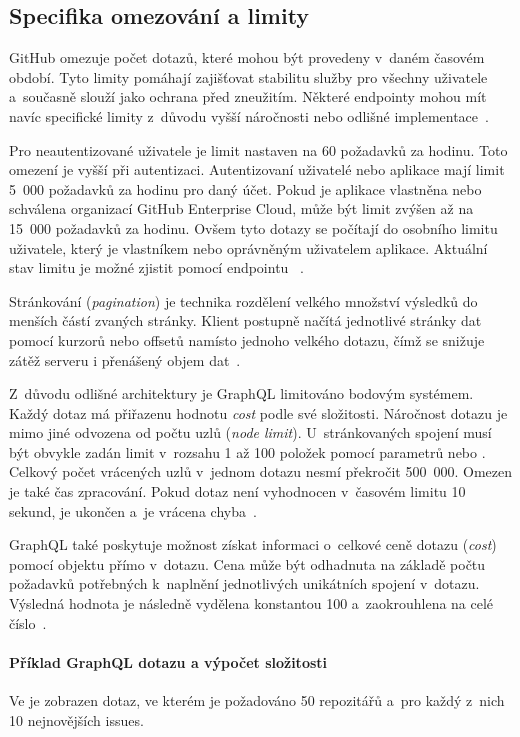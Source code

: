 \subsection{Specifika omezování a limity}
\label{subsec:github_api_limits}
GitHub omezuje počet dotazů, které mohou být provedeny v~daném časovém období. Tyto limity pomáhají zajišťovat stabilitu služby pro všechny uživatele a~současně slouží jako ochrana před zneužitím. Některé endpointy mohou mít navíc specifické limity z~důvodu vyšší náročnosti nebo odlišné implementace~\cite{github_rate_limits}.

Pro neautentizované uživatele je limit \REST \API nastaven na 60 požadavků za hodinu. Toto omezení je vyšší při autentizaci. Autentizovaní uživatelé nebo aplikace mají limit 5~000 požadavků za hodinu pro daný účet. Pokud je aplikace vlastněna nebo schválena organizací GitHub Enterprise Cloud, může být limit zvýšen až na 15~000 požadavků za hodinu. Ovšem tyto dotazy se počítají do osobního limitu uživatele, který je vlastníkem nebo oprávněným uživatelem aplikace. Aktuální stav limitu je možné zjistit pomocí endpointu ~\cite{github_rate_limits}.

Stránkování (\textit{pagination}) je technika rozdělení velkého množství výsledků do menších částí zvaných stránky. Klient postupně načítá jednotlivé stránky dat pomocí kurzorů nebo offsetů namísto jednoho velkého dotazu, čímž se snižuje zátěž serveru i přenášený objem dat~\cite{github_graphql_api}.

Z~důvodu odlišné architektury je GraphQL \API limitováno bodovým systémem. Každý dotaz má přiřazenu hodnotu \textit{cost} podle své složitosti. Náročnost dotazu je mimo jiné odvozena od počtu uzlů (\textit{node limit}). U~stránkovaných spojení musí být obvykle zadán limit v~rozsahu 1 až 100 položek pomocí parametrů  nebo . Celkový počet vrácených uzlů v~jednom dotazu nesmí překročit 500~000. Omezen je také čas zpracování. Pokud dotaz není vyhodnocen v~časovém limitu 10 sekund, je ukončen a~je vrácena chyba~\cite{github_graphql_rate_limits}.

GraphQL \API také poskytuje možnost získat informaci o~celkové ceně dotazu (\textit{cost}) pomocí objektu  přímo v~dotazu. Cena může být odhadnuta na základě počtu požadavků potřebných k~naplnění jednotlivých unikátních spojení v~dotazu. Výsledná hodnota je následně vydělena konstantou 100 a~zaokrouhlena na celé číslo~\cite{github_graphql_rate_limits}.

\paragraph*{Příklad GraphQL dotazu a výpočet složitosti}
\label{par:github:graphql:priklad_slozitosti}
Ve  je zobrazen dotaz, ve kterém je požadováno 50 repozitářů a~pro každý z~nich 10 nejnovějších issues.

